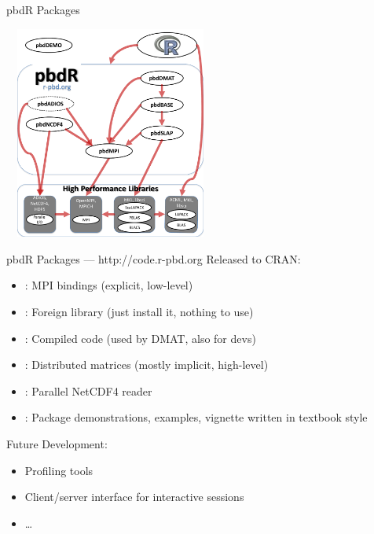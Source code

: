 \begin{frame}[shrink]
  \begin{block}{pbdR Packages}
    \begin{center}
        \includegraphics[width=7cm, height=7cm]{pics/pbdpacks}
    \end{center}
  \end{block}
\end{frame}


\begin{frame}[shrink]
  \begin{block}{pbdR Packages --- http://code.r-pbd.org}\pause
  Released to CRAN:
  \begin{itemize}[<+-|alert@+>]
    \item {}: MPI bindings (explicit, low-level)
    \item {}: Foreign library (just install it, nothing to use)
    \item {}: Compiled code (used by DMAT, also for devs)
    \item {}: Distributed matrices (mostly implicit, high-level)
    \item {}: Parallel NetCDF4 reader
    \item {}: Package demonstrations, examples, vignette written in textbook style
  \end{itemize}
    Future Development:
  \begin{itemize}[<+-|alert@+>]
    \item Profiling tools
    \item Client/server interface for interactive sessions
    \item \dots
  \end{itemize}
  \end{block}
\end{frame}



